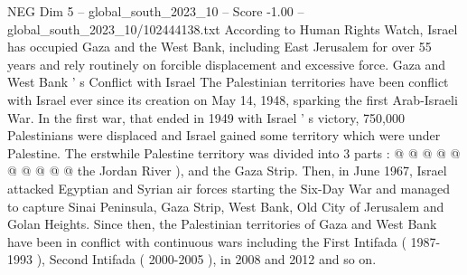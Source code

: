 \begin{textsample}{NEG Dim 5 – global\_south\_2023\_10 – Score -1.00 – global\_south\_2023\_10/102444138.txt}
According to Human Rights Watch, Israel has occupied Gaza and the West Bank, including East Jerusalem for over 55 years and rely routinely on forcible displacement and excessive force.
Gaza and West Bank ' s Conflict with Israel The Palestinian territories have been conflict with Israel ever since its creation on May 14, 1948, sparking the first Arab-Israeli War.
In the first war, that ended in 1949 with Israel ' s victory, 750,000 Palestinians were displaced and Israel gained some territory which were under Palestine.
The erstwhile Palestine territory was divided into 3 parts : @ @ @ @ @ @ @ @ @ @ the Jordan River ), and the Gaza Strip.
Then, in June 1967, Israel attacked Egyptian and Syrian air forces starting the Six-Day War and managed to capture Sinai Peninsula, Gaza Strip, West Bank, Old City of Jerusalem and Golan Heights.
Since then, the Palestinian territories of Gaza and West Bank have been in conflict with continuous wars including the First Intifada ( 1987-1993 ), Second Intifada ( 2000-2005 ), in 2008 and 2012 and so on.

\end{textsample}

